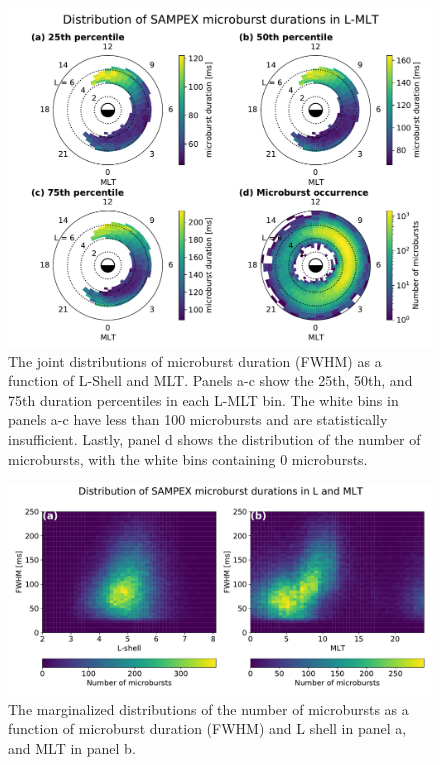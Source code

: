 \documentclass[draft]{agujournal2019}
\begin{document}
\begin{figure}
\noindent\includegraphics[width=\textwidth]{figures/fig3.pdf}
\caption{The joint distributions of microburst duration (FWHM) as a function of L-Shell and MLT. Panels a-c show the 25th, 50th, and 75th duration percentiles in each L-MLT bin. The white bins in panels a-c have less than 100 microbursts and are statistically insufficient. Lastly, panel d shows the distribution of the number of microbursts, with the white bins containing 0 microbursts.}
\label{fig3}
\end{figure}

\begin{figure}
\noindent\includegraphics[width=\textwidth]{figures/fig4.pdf}
\caption{The marginalized distributions of the number of microbursts as a function of microburst duration (FWHM) and L shell in panel a, and MLT in panel b.}
\label{fig4}
\end{figure}
\end{document}
